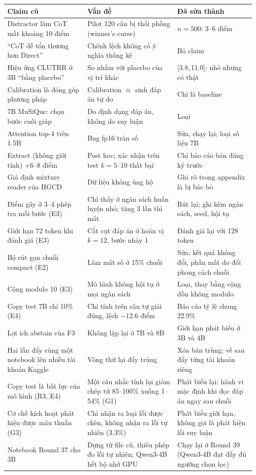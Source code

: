 \documentclass[11pt]{article}
\newcommand{\ci}[2]{{\scriptsize[#1,\,#2]}}
\begin{document}
\begin{table}[h]
\centering\small
\begin{tabularx}{\linewidth}{@{}>{\raggedright\arraybackslash}X>{\raggedright\arraybackslash}X>{\raggedright\arraybackslash}X@{}}
\toprule
Claim cũ & Vấn đề & Đã sửa thành \\
\midrule
Distractor làm CoT mất khoảng 10 điểm & Pilot 120 câu bị thổi phồng (winner's curse) & $n=500$: 3--6 điểm \\
``CoT dễ tổn thương hơn Direct'' & Chênh lệch không có ý nghĩa thống kê & Bỏ claim \\
Hiệu ứng CLUTRR ở 3B ``bằng placebo'' & So nhầm với placebo của vị trí khác & 7.3 \ci{3.8}{11.0}: nhỏ nhưng có thật \\
Calibration là đóng góp phương pháp & Calibration $\approx$ sinh đáp án tự do & Chỉ là baseline \\
7B MuSiQue: chọn bước cuối giúp & Do định dạng đáp án, không do suy luận & Loại \\
Attention top-4 trên 1.5B & Bug fp16 tràn số & Sửa, chạy lại; loại số liệu 7B \\
Extract (không giới tính) $+6$--8 điểm & Post hoc; xác nhận trên test $k=5$--10 thất bại & Chỉ báo cáo bản đăng ký trước \\
Giả định mixture reader của HGCD & Dữ liệu không ủng hộ & Ghi rõ trong appendix là bị bác bỏ \\
Điểm gãy ở 3--4 phép tra mỗi bước (E3) & Chỉ thấy ở ngân sách huấn luyện nhỏ; tăng 3 lần thì mất & Rút lại; ghi kèm ngân sách, seed, hội tụ \\
Giới hạn 72 token khi đánh giá (E3) & Cắt cụt đáp án ở hoán vị $k=12$, bước nhảy 1 & Đánh giá lại với 128 token \\
Bộ rút gọn chuỗi compact (E2) & Làm mất số ở 15\% chuỗi & Sửa; kết quả không đổi, phần mất do đổi phong cách chuỗi \\
Cộng modulo 10 (E3) & Mô hình không hội tụ ở mọi ngân sách & Loại, thay bằng cộng dồn không modulo \\
Copy test 7B chỉ 10\% (E4) & Chỉ tính trên câu tự giải đúng, lệch $-12.6$ điểm & Báo cáo tỷ lệ chung 22.9\% \\
Lợi ích abstain của F3 & Không lặp lại ở 7B và 8B & Giới hạn phát biểu ở 3B và 4B \\
Hai lần đẩy cùng một notebook lên nhiều tài khoản Kaggle & Vòng thử lại đẩy trùng & Xóa bản trùng; về sau đẩy từng tài khoản riêng \\
Copy test là bất lực của mô hình (R3, E4) & Một câu nhắc tính lại giảm chép từ 85--100\% xuống 1--54\% (G1) & Phát biểu lại: hành vi mặc định khi đọc đáp án ngay sau chuỗi \\
Cơ chế kích hoạt phát hiện được mâu thuẫn (G3) & Chỉ nhận ra loại lỗi được chèn, không nhận ra lỗi tự nhiên (3.3\%) & Phát biểu giới hạn, không gọi là phát hiện lỗi suy luận \\
Notebook Round 37 cho 3B & Dựng từ file cũ, thiếu phép đo lỗi tự nhiên; Qwen3-4B hết bộ nhớ GPU & Chạy lại ở Round 39 (Qwen3-4B đạt đầy đủ ngưỡng chọn lọc) \\
\bottomrule
\end{tabularx}
\end{table}
\end{document}

